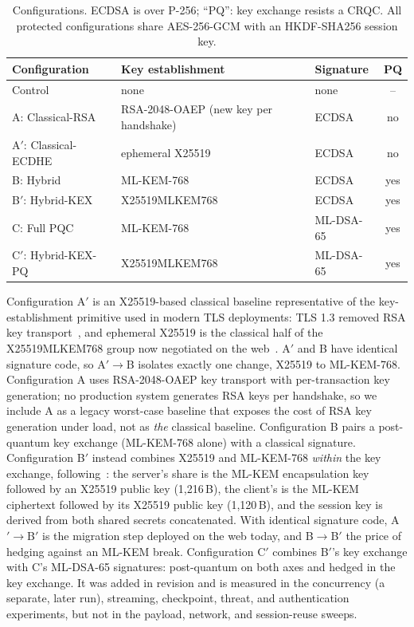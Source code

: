 \documentclass[conference]{IEEEtran}
\begin{document}
\begin{table}[t]
\centering
\caption{Configurations. ECDSA is over P-256; ``PQ'': key exchange resists a CRQC. All protected configurations share AES-256-GCM with an HKDF-SHA256 session key.}
\label{tab:configs}
\setlength{\tabcolsep}{3pt}
\footnotesize
\begin{tabular}{@{}lL{2.6cm}lc@{}}
\toprule
Configuration & Key establishment & Signature & PQ \\
\midrule
Control & none & none & -- \\
A: Classical-RSA & RSA-2048-OAEP (new key per handshake) & ECDSA & no \\
A$'$: Classical-ECDHE & ephemeral X25519 & ECDSA & no \\
B: Hybrid & ML-KEM-768 & ECDSA & yes \\
B$'$: Hybrid-KEX & X25519MLKEM768 & ECDSA & yes \\
C: Full PQC & ML-KEM-768 & ML-DSA-65 & yes \\
C$'$: Hybrid-KEX-PQ & X25519MLKEM768 & ML-DSA-65 & yes \\
\bottomrule
\end{tabular}
\end{table}

Configuration A$'$ is an X25519-based classical baseline representative of the key-establishment
primitive used in modern TLS deployments: TLS 1.3 removed RSA key transport~\cite{rfc8446}, and
ephemeral X25519 is the classical half of the X25519MLKEM768 group now negotiated on the
web~\cite{ietf-ecdhe-mlkem}. A$'$ and B have identical signature code, so
A$'\!\rightarrow$B isolates exactly one change, X25519 to ML-KEM-768. Configuration A uses RSA-2048-OAEP key transport with per-transaction key
generation; no production system generates RSA keys per handshake, so we include A as a legacy
worst-case baseline that exposes the cost of RSA key generation under load, not as \emph{the}
classical baseline. Configuration B pairs a post-quantum key exchange (ML-KEM-768 alone) with a classical
signature. Configuration B$'$ instead combines X25519 and ML-KEM-768 \emph{within} the key exchange,
following~\cite{ietf-ecdhe-mlkem}: the server's share is the ML-KEM encapsulation key followed by an
X25519 public key (1,216\,B), the client's is the ML-KEM ciphertext followed by its X25519 public key
(1,120\,B), and the session key is derived from both shared secrets concatenated. With identical
signature code, A$'\!\rightarrow$B$'$ is the migration step deployed on the web today, and
B$\rightarrow$B$'$ the price of hedging against an ML-KEM break. Configuration C$'$ combines B$'$'s key
exchange with C's ML-DSA-65 signatures: post-quantum on both axes and hedged in the key exchange. It
was added in revision and is measured in the concurrency (a separate, later run), streaming, checkpoint,
threat, and authentication experiments, but not in the payload, network, and session-reuse sweeps.
\end{document}
